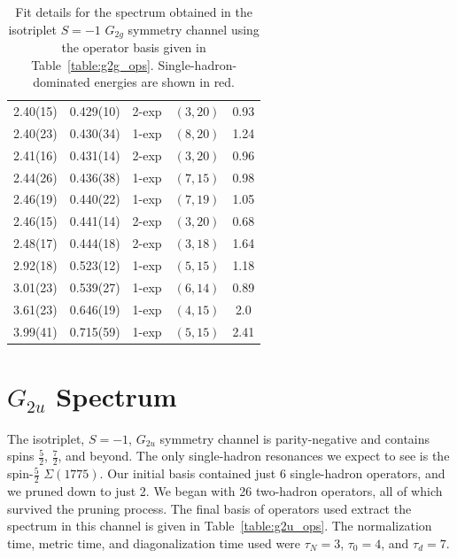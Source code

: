 \begin{table}[H]
\begin{tabu}{c|c|c|c|c}
        2.40(15)&0.429(10)&2{-}exp&$(3, 20)$&0.93\\
        2.40(23)&0.430(34)&1{-}exp&$(8, 20)$&1.24\\
        \rowfont{\color{red}}
        2.41(16)&0.431(14)&2{-}exp&$(3, 20)$&0.96\\
        2.44(26)&0.436(38)&1{-}exp&$(7, 15)$&0.98\\
        2.46(19)&0.440(22)&1{-}exp&$(7, 19)$&1.05\\
        2.46(15)&0.441(14)&2{-}exp&$(3, 20)$&0.68\\
        2.48(17)&0.444(18)&2{-}exp&$(3, 18)$&1.64\\
        2.92(18)&0.523(12)&1{-}exp&$(5, 15)$&1.18\\
        3.01(23)&0.539(27)&1{-}exp&$(6, 14)$&0.89\\
        3.61(23)&0.646(19)&1{-}exp&$(4, 15)$&2.0\\
        \rowfont{\color{red}}
        3.99(41)&0.715(59)&1{-}exp&$(5, 15)$&2.41
    \end{tabu}
    \caption[Fit details for the spectrum obtained in the isotriplet $S=-1$ $G_{2g}$ symmetry channel using the operator basis given in Table~\ref{table:g2g_ops}.]{Fit details for the spectrum obtained in the isotriplet $S=-1$ $G_{2g}$ symmetry channel using the operator basis given in Table~\ref{table:g2g_ops}. Single-hadron-dominated energies are shown in red.}\label{table:g2g_fits}
\end{table}
\renewcommand{\arraystretch}{1.5}

\section{$G_{2u}$ Spectrum}
The isotriplet, $S=-1$, $G_{2u}$ symmetry channel is parity-negative and contains spins $\frac{5}{2}$, $\frac{7}{2}$, and beyond. The only single-hadron resonances we expect to see is the spin-$\frac{5}{2}$ $\Sigma(1775)$. Our initial basis contained just 6 single-hadron operators, and we pruned down to just 2. We began with 26 two-hadron operators, all of which survived the pruning process. The final basis of operators used extract the spectrum in this channel is given in Table~\ref{table:g2u_ops}. The normalization time, metric time, and diagonalization time used were $\tau_N=3$, $\tau_0=4$, and $\tau_d=7$.

